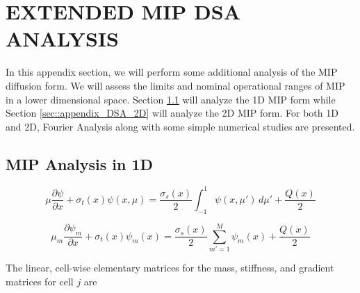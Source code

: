 %
%
%


\chapter{\uppercase {Extended MIP DSA Analysis}}
\label{sec::appendix_DSA}

In this appendix section, we will perform some additional analysis of the MIP diffusion form. We will assess the limits and nominal operational ranges of MIP in a lower dimensional space. Section \ref{sec::appendix_DSA_1D} will analyze the 1D MIP form while Section \ref{sec::appendix_DSA_2D} will analyze the 2D MIP form. For both 1D and 2D, Fourier Analysis along with some simple numerical studies are presented.

\section{MIP Analysis in 1D}
\label{sec::appendix_DSA_1D}

\begin{equation}
\label{eq:1D_transport_eq}
\mu \frac{\partial \psi}{\partial x} + \sigma_t (x) \psi(x,\mu) = \frac{\sigma_s (x)}{2} \int_{-1}^{1} \psi(x,\mu') \, d\mu' + \frac{Q(x)}{2}
\end{equation}

\begin{equation}
\label{eq:1D_transport_discangle}
\mu_m \frac{\partial \psi_m}{\partial x} + \sigma_t (x) \psi_m (x)= \frac{\sigma_s (x)}{2} \sum_{m'=1}^{M} \psi_m (x) + \frac{Q(x)}{2}
\end{equation}

The linear, cell-wise elementary matrices for the mass, stiffness, and gradient matrices for cell $j$ are

